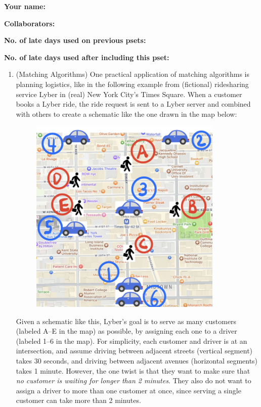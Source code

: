 \documentclass[11pt]{article}
\begin{document}

\textbf{Your name: }

\textbf{Collaborators: }

\textbf{No. of late days used on previous psets: }

\textbf{No. of late days used after including this pset: }

\begin{enumerate}
 \item (Matching Algorithms) 
 One practical application of matching algorithms is planning logistics, like in the following example from (fictional) ridesharing service Lyber in (real) New York City's Times Square.  When a customer books a Lyber ride, the ride request is sent to a Lyber server and combined with others to create a schematic 
 like the one drawn in the map below:

\begin{figure}[H]
    \centering
    \includegraphics[width=0.87\textwidth]{NYC-map-zoomed-light.jpeg}
    \label{fig:travel_time_graph}
\end{figure}
Given a schematic like this, Lyber's goal is to serve as many customers (labeled A--E in the map) as possible, by assigning each one to a driver (labeled 1--6 in the map). For simplicity, each customer and driver is at an intersection, and assume driving between adjacent streets (vertical segment) takes 30 seconds, and driving between adjacent avenues (horizontal segments) takes 1 minute. However, the one twist is that they want to make sure that \textit{no customer is waiting for longer than 2 minutes}.  They also do not want to assign a driver to more than one customer at once, since serving a single customer can take more than 2 minutes.


\end{enumerate}
\end{document}
